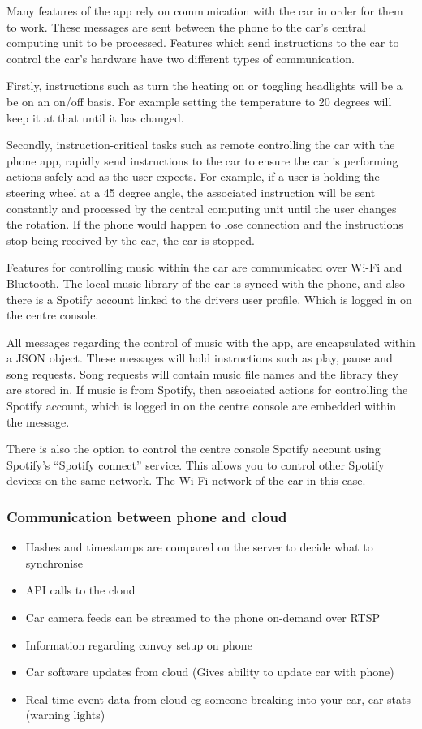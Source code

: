 \documentclass{article}
\begin{document}
Many features of the app rely on communication with the car in order for them to work. These messages are sent between the phone to the car's central computing unit to be processed. Features which send instructions to the car to control the car's hardware have two different types of communication.

Firstly, instructions such as turn the heating on or toggling headlights will be a be on an on/off basis. For example setting the temperature to 20 degrees will keep it at that until it has changed.

Secondly, instruction-critical tasks such as remote controlling the car with the phone app, rapidly send instructions to the car to ensure the car is performing actions safely and as the user expects. For example, if a user is holding the steering wheel at a 45 degree angle, the associated instruction will be sent constantly and processed by the central computing unit until the user changes the rotation. If the phone would happen to lose connection and the instructions stop being received by the car, the car is stopped.

Features for controlling music within the car are communicated over Wi-Fi and Bluetooth. The local music library of the car is synced with the phone, and also there is a Spotify account linked to the drivers user profile. Which is logged in on the centre console.

All messages regarding the control of music with the app, are encapsulated within a JSON object. These messages will hold instructions such as play, pause and song requests. Song requests will contain music file names and the library they are stored in.
If music is from Spotify, then associated actions for controlling the Spotify account, which is logged in on the centre console are embedded within the message.

There is also the option to control the centre console Spotify account using Spotify's ``Spotify connect'' service. This allows you to control other Spotify devices on the same network. The Wi-Fi network of the car in this case.

\subsubsection{Communication between phone and cloud}

\begin{itemize}
  \item Hashes and timestamps are compared on the server to decide what to synchronise
  \item API calls to the cloud
  \item Car camera feeds can be streamed to the phone on-demand over RTSP
  \item Information regarding convoy setup on phone
  \item Car software updates from cloud (Gives ability to update car with phone)
  \item Real time event data from cloud eg someone breaking into your car, car stats (warning lights)
\end{itemize}
\end{document}
